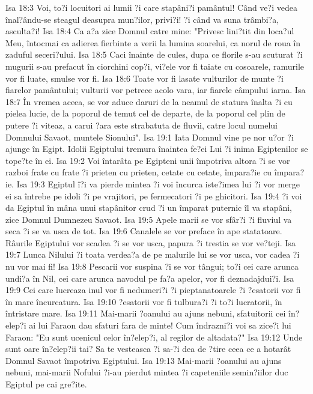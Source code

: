 Isa 18:3  Voi, to?i locuitori ai lumii ?i care stapâni?i pamântul! Când ve?i vedea înal?ându-se steagul deasupra mun?ilor, privi?i! ?i când va suna trâmbi?a, asculta?i!
Isa 18:4  Ca a?a zice Domnul catre mine: "Privesc lini?tit din loca?ul Meu, întocmai ca adierea fierbinte a verii la lumina soarelui, ca norul de roua în zaduful seceri?ului.
Isa 18:5  Caci înainte de cules, dupa ce florile s-au scuturat ?i mugurii s-au prefacut în ciorchini cop?i, vi?ele vor fi taiate cu cosoarele, ramurile vor fi luate, smulse vor fi.
Isa 18:6  Toate vor fi lasate vulturilor de munte ?i fiarelor pamântului; vulturii vor petrece acolo vara, iar fiarele câmpului iarna.
Isa 18:7  În vremea aceea, se vor aduce daruri de la neamul de statura înalta ?i cu pielea lucie, de la poporul de temut cel de departe, de la poporul cel plin de putere ?i viteaz, a carui ?ara este strabatuta de fluvii, catre locul numelui Domnului Savaot, muntele Sionului".
Isa 19:1  Iata Domnul vine pe nor u?or ?i ajunge în Egipt. Idolii Egiptului tremura înaintea fe?ei Lui ?i inima Egiptenilor se tope?te în ei.
Isa 19:2  Voi întarâta pe Egipteni unii împotriva altora ?i se vor razboi frate cu frate ?i prieten cu prieten, cetate cu cetate, împara?ie cu împara?ie.
Isa 19:3  Egiptul î?i va pierde mintea ?i voi încurca iste?imea lui ?i vor merge ei sa întrebe pe idoli ?i pe vrajitori, pe fermecatori ?i pe ghicitori.
Isa 19:4  ?i voi da Egiptul în mâna unui stapânitor crud ?i un împarat puternic îl va stapâni, zice Domnul Dumnezeu Savaot.
Isa 19:5  Apele marii se vor sfâr?i ?i fluviul va seca ?i se va usca de tot.
Isa 19:6  Canalele se vor preface în ape statatoare. Râurile Egiptului vor scadea ?i se vor usca, papura ?i trestia se vor ve?teji.
Isa 19:7  Lunca Nilului ?i toata verdea?a de pe malurile lui se vor usca, vor cadea ?i nu vor mai fi!
Isa 19:8  Pescarii vor suspina ?i se vor tângui; to?i cei care arunca undi?a în Nil, cei care arunca navodul pe fa?a apelor, vor fi deznadajdui?i.
Isa 19:9  Cei care lucreaza inul vor fi nedumeri?i ?i pieptanatoarele ?i ?esatorii vor fi în mare încurcatura.
Isa 19:10  ?esatorii vor fi tulbura?i ?i to?i lucratorii, în întristare mare.
Isa 19:11  Mai-marii ?oanului au ajuns nebuni, sfatuitorii cei în?elep?i ai lui Faraon dau sfaturi fara de minte! Cum îndrazni?i voi sa zice?i lui Faraon: "Eu sunt ucenicul celor în?elep?i, al regilor de altadata?"
Isa 19:12  Unde sunt oare în?elep?ii tai? Sa te vesteasca ?i sa-?i dea de ?tire ceea ce a hotarât Domnul Savaot împotriva Egiptului.
Isa 19:13  Mai-marii ?oanului au ajuns nebuni, mai-marii Nofului ?i-au pierdut mintea ?i capeteniile semin?iilor duc Egiptul pe cai gre?ite.
